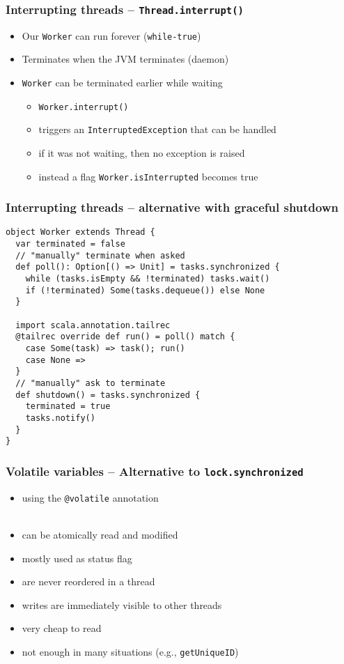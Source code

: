 \documentclass[aspectratio=169]{beamer}
\begin{document}
\begin{frame}\frametitle{Interrupting threads -- \texttt{Thread.interrupt()}}
\begin{itemize}
  \item Our \texttt{Worker} can run forever (\texttt{while-true})
  \item Terminates when the JVM terminates (daemon)
  \item \texttt{Worker} can be terminated earlier while waiting
    \begin{itemize}
      \item \alert{\texttt{Worker.interrupt()}}
      \item triggers an \alert{\texttt{InterruptedException}} that can be handled
      \item if it was not waiting, then no exception is raised
      \item instead a flag \alert{\texttt{Worker.isInterrupted}} becomes true
    \end{itemize}
\end{itemize}
\end{frame}

\begin{frame}[fragile]\frametitle{Interrupting threads -- alternative with graceful shutdown}
    
\begin{lstlisting}[emph={sleep,log,thread,join,synchronized,wait,notify}]
object Worker extends Thread {
  var terminated = false
  // "manually" terminate when asked
  def poll(): Option[() => Unit] = tasks.synchronized {
    while (tasks.isEmpty && !terminated) tasks.wait()
    if (!terminated) Some(tasks.dequeue()) else None
  }

  import scala.annotation.tailrec
  @tailrec override def run() = poll() match {
    case Some(task) => task(); run()
    case None =>
  }
  // "manually" ask to terminate
  def shutdown() = tasks.synchronized {
    terminated = true
    tasks.notify()
  }
}
\end{lstlisting}

\end{frame}


\begin{frame}\frametitle{Volatile variables -- Alternative to \texttt{lock.synchronized}}
\begin{itemize}
  \item using the \texttt{\alert{@volatile}} annotation
  \\~
  \item can be atomically read and modified
  \item mostly used as status flag
  \item are never reordered in a thread
  \item writes are immediately visible to other threads
  \item very cheap to read
  \item not enough in many situations (e.g., \texttt{getUniqueID})
\end{itemize}
\end{frame}
\end{document}
